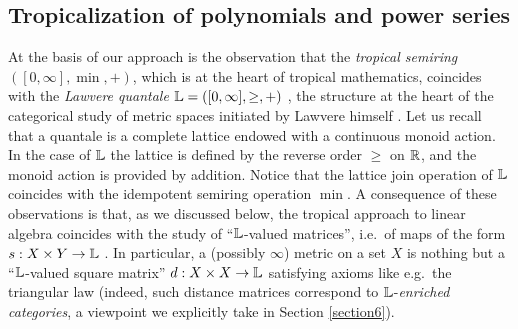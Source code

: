 \subsection{Tropicalization of polynomials and power series}

At the basis of our approach is the observation that the \emph{tropical semiring} $([0,\infty], \min, +)$, which is at the heart of tropical mathematics, coincides with the \emph{Lawvere quantale} $\mathbb{L}=([0,\infty], \geq, +)$ \cite{Hofmann2014, Stubbe2014}, the structure at the heart of the categorical study of metric spaces initiated by Lawvere himself \cite{Lawvere1973}.
Let us recall that a quantale is a complete lattice endowed with a continuous monoid action. In the case of $\mathbb{L}$ the lattice is defined by the reverse order $\geq$ on $\mathbb{R}$, and the monoid action is provided by addition. Notice that the lattice join operation of $\mathbb{L}$ coincides with the idempotent semiring operation $\min$. 
A consequence of these observations is that, as we discussed below, the tropical approach to linear algebra coincides with the study of ``$\mathbb{L}$-valued matrices'', i.e.~of maps of the form $s: X\times Y\to \mathbb{L}$ .
In particular, a (possibly $\infty$) metric on a set $X$ is nothing but a ``$\mathbb{L}$-valued square matrix'' $d:X\times X\to \mathbb{L}$ satisfying axioms like e.g.~the triangular law (indeed, such distance matrices correspond to $\mathbb{L}$-\emph{enriched categories}, a viewpoint we explicitly take in Section \ref{section6}). 

